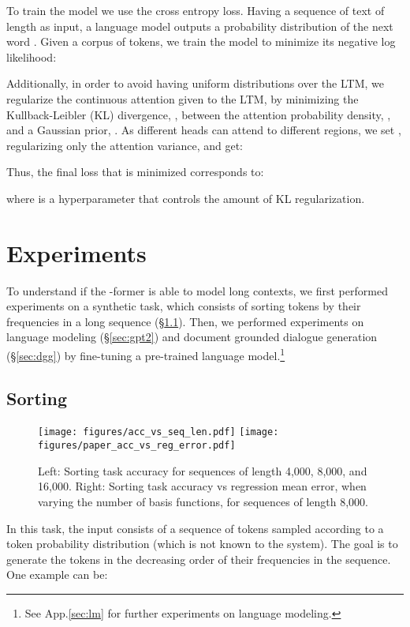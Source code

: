 \documentclass[11pt]{article}
\begin{document}
To train the model we use the cross entropy loss. Having a sequence of text  of length  as input, a language model outputs a probability distribution of the next word . Given a corpus of  tokens, we train the model to minimize its negative log likelihood:


Additionally, in order to avoid having uniform distributions over the LTM, we regularize the continuous attention given to the LTM, by minimizing the Kullback-Leibler (KL) divergence, , between the attention probability density, , and a Gaussian prior, . As different heads can attend to different regions, we set , regularizing only the attention variance, and get:


Thus, the final loss that is minimized corresponds to:

where  is a hyperparameter that controls the amount of KL regularization.

\section{Experiments}
\label{sec:experiments}
To understand if the -former is able to model long contexts, we first performed experiments on a synthetic task, which consists of sorting tokens by their frequencies in a long sequence (\S \ref{sec:sorting}). 
Then, we performed experiments on language modeling  (\S \ref{sec:gpt2}) and document grounded dialogue generation (\S \ref{sec:dgg}) by fine-tuning a pre-trained language model.\footnote{See App.\ref{sec:lm} for further experiments on language modeling.}

\subsection{Sorting}
\label{sec:sorting}

\begin{figure*}[t]
    \centering
    \texttt{[image: figures/acc\_vs\_seq\_len.pdf]}
    \texttt{[image: figures/paper\_acc\_vs\_reg\_error.pdf]}
    \caption{Left: Sorting task accuracy for sequences of length 4,000, 8,000, and 16,000. Right: Sorting task accuracy vs regression mean error, when varying the number of basis functions, for sequences of length 8,000.}
    \label{fig:sorting_results}
\end{figure*}

In this task, the input consists of a sequence of tokens sampled according to a token probability distribution (which is not known to the system). The goal 
is to generate the tokens in the decreasing order of their frequencies in the sequence. 
One example can be:
\end{document}
